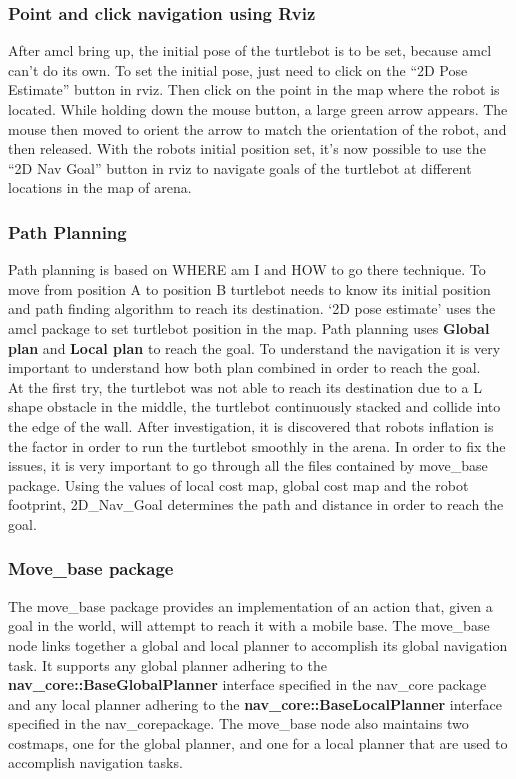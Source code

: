 \documentclass[10pt,a4paper]{article}
\begin{document}
\subsubsection{Point and click navigation using Rviz}
After amcl bring up, the initial pose of the turtlebot is to be set, because amcl can’t do its own. To set the initial pose, just need to click on the “2D Pose Estimate” button in rviz. Then click on the point in the map where the robot is located. While holding down the mouse button, a large green arrow appears. The mouse then moved to orient the arrow to match the orientation of the robot, and then released. With the robots initial position set, it’s now possible to use the “2D Nav Goal” button in rviz to navigate goals of the turtlebot at different locations in the map of arena.\\

\subsubsection{Path Planning}
Path planning is based on WHERE am I and HOW to go there technique. To move from position A to position B turtlebot needs to know its initial position and path finding algorithm to reach its destination. ‘2D pose estimate’ uses the amcl package to set turtlebot position in the map. Path planning uses \textbf{Global plan} and \textbf{Local plan} to reach the goal. To understand the navigation it is very important to understand how both plan combined in order to reach the goal. \\

At the first try, the turtlebot was not able to reach its destination due to a L shape obstacle in the middle, the turtlebot continuously stacked and collide into the edge of the wall. After investigation, it is discovered that robots inflation is the factor in order to run the turtlebot smoothly in the arena. In order to fix the issues, it is very important to go through all the files contained by move\_base package. Using the values of local cost map, global cost map and the robot footprint, 2D\_Nav\_Goal determines the path and distance in order to reach the goal. \\

\subsubsection{Move\_base package}

The move\_base package provides an implementation of an action that, given a goal in the world, will attempt to reach it with a mobile base. The move\_base node links together a global and local planner to accomplish its global navigation task. It supports any global planner adhering to the \textbf{nav\_core::BaseGlobalPlanner} interface specified in the nav\_core package and any local planner adhering to the \textbf{nav\_core::BaseLocalPlanner} interface specified in the nav\_corepackage. The move\_base node also maintains two costmaps, one for the global planner, and one for a local planner that are used to accomplish navigation tasks.\\
\end{document}
